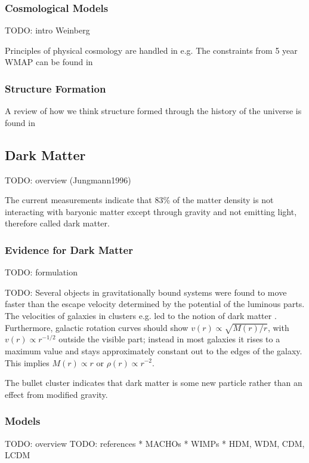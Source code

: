 \documentclass[useAMS,usenatbib]{mn2e}
\begin{document}
\subsubsection{Cosmological Models}
TODO: intro Weinberg \cite{TODO:Weinberg}

Principles of physical cosmology are handled in e.g. \citep{TODO:Peacock}
The constraints from 5 year WMAP can be found in \citep{Komatsu2009}

\subsubsection{Structure Formation}
A review of how we think structure formed through the history of the
universe is found in \cite{TODO:padmanabhan}

\subsection{Dark Matter}
TODO: overview (Jungmann1996)


The current measurements \citep{Komatsu2009} indicate that 83\% of the
matter density is not interacting with baryonic matter except through
gravity and not emitting light, therefore called dark matter.

\subsubsection{Evidence for Dark Matter}
TODO: formulation

TODO: \citep{Jungman1996} Several objects in gravitationally bound
systems were found to move faster than the escape velocity determined
by the potential of the luminous parts. The velocities of galaxies in
clusters e.g. led to the notion of {\sc dark matter}
\citep{Zwicky1933}. Furthermore, galactic rotation curves should show
$v(r)\propto\sqrt{M(r)/r}$, with $v(r)\propto r^{-1/2}$ outside the
visible part; instead in most galaxies it rises to a maximum value and
stays approximately constant out to the edges of the galaxy. This
implies $M(r)\propto r$ or $\rho(r)\propto r^{-2}$.

The bullet cluster \cite{Clove2006} indicates that dark matter is some
new particle rather than an effect from modified gravity.

\subsubsection{Models}
TODO: overview
TODO: references
* MACHOs
* WIMPs
* HDM, WDM, CDM, LCDM
\end{document}

